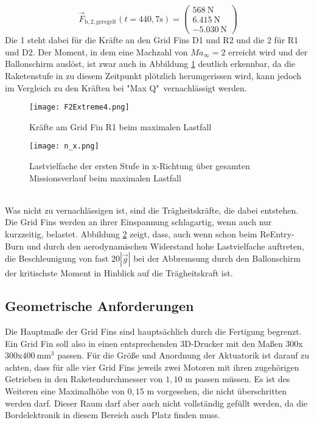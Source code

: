 \begin{equation}\label{eq_Fmax2}
\vec{F}_\mathrm{b, 2, geregelt}(t=440,7\mathrm{s})
=\left(\begin{array}{r}568\mathrm{\ N}\\6.415\mathrm{\ N}\\-5.030\mathrm{\ N}\end{array}\right)
\end{equation}
Die 1 steht dabei für die Kräfte an den Grid Fins D1 und R2 und die 2 für R1 und D2.
Der Moment, in dem eine Machzahl von $Ma_\infty = 2$ erreicht wird und der Ballonschirm auslöst, ist zwar auch in Abbildung \ref{abb_FExtreme} deutlich erkennbar, da die Raketenstufe in zu diesem Zeitpunkt plötzlich herumgerissen wird, kann jedoch im Vergleich zu den Kräften bei "Max Q"\ vernachlässigt werden.
\begin{figure}[h] 
	\centering
	\texttt{[image: F2Extreme4.png]}
	\caption{Kräfte am Grid Fin R1 beim maximalen Lastfall}
	\label{abb_FExtreme}
\end{figure}
\begin{figure}[h] 
\centering
\texttt{[image: n\_x.png]}
\caption{Lastvielfache der ersten Stufe in x-Richtung über gesamten Missionsverlauf beim maximalen Lastfall}
\label{abb_n_x}
\end{figure}\\
Was nicht zu vernachlässigen ist, sind die Trägheitskräfte, die dabei entstehen. Die Grid Fins werden an ihrer Einspannung schlagartig, wenn auch nur kurzzeitig, belastet. Abbildung \ref{abb_n_x} zeigt, dass, auch wenn schon beim ReEntry-Burn und durch den aerodynamischen Widerstand hohe Lastvielfache auftreten, die Beschleunigung von fast 20$|\vec{g}|$ bei der Abbremsung durch den Ballonschirm der kritischste Moment in Hinblick auf die Trägheitskraft ist.
\subsection{Geometrische Anforderungen}
Die Hauptmaße der Grid Fins sind hauptsächlich durch die Fertigung begrenzt. Ein Grid Fin soll also in einen entsprechenden 3D-Drucker mit den Maßen $300$x$300$x$400\mathrm{\ mm}^3$ passen. Für die Größe und Anordnung der Aktuatorik ist darauf zu achten, dass für alle vier Grid Fins jeweils zwei Motoren mit ihren zugehörigen Getrieben in den Raketendurchmesser von $1,10$ m passen müssen. Es ist des Weiteren eine Maximalhöhe von $0,15$ m vorgesehen, die nicht überschritten werden darf. Dieser Raum darf aber auch nicht vollständig gefüllt werden, da die Bordelektronik in diesem Bereich auch Platz finden muss.
